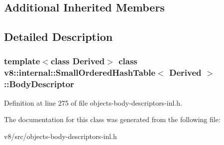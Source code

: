 \subsection*{Additional Inherited Members}


\subsection{Detailed Description}
\subsubsection*{template$<$class Derived$>$\newline
class v8\+::internal\+::\+Small\+Ordered\+Hash\+Table$<$ Derived $>$\+::\+Body\+Descriptor}



Definition at line 275 of file objects-\/body-\/descriptors-\/inl.\+h.



The documentation for this class was generated from the following file\+:\begin{DoxyCompactItemize}
\item 
v8/src/objects-\/body-\/descriptors-\/inl.\+h\end{DoxyCompactItemize}

